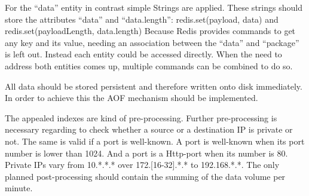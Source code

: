For the “data” entity in contrast simple Strings are applied. These strings should store the attributes “data” and “data.length”: redis.set(payload, data) and redis.set(payloadLength, data.length)
Because Redis provides commands to get any key and its value, needing an association between the “data” and “package” is left out. Instead each entity could be accessed directly. When the need to address both entities comes up, multiple commands can be combined to do so. 

All data should be stored persistent and therefore written onto disk immediately. In order to achieve this the AOF mechanism should be implemented. 

The appealed indexes are kind of pre-processing. Further pre-processing is necessary regarding to check whether a source or a destination IP is private or not. The same is valid if a port is well-known. A port is well-known when its port number is lower than 1024. And a port is a Http-port when its number is 80. Private IPs vary from 10.*.*.* over 172.[16-32].*.* to 192.168.*.*. The only planned post-processing should contain the summing of the data volume per minute. 

